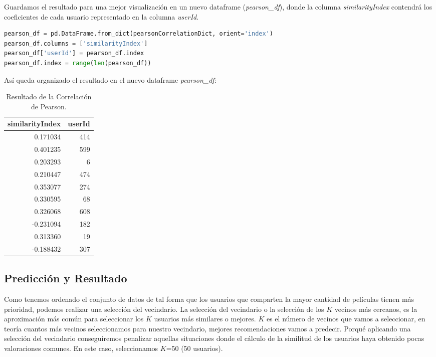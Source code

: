 \documentclass{uimppracticas}
\begin{document}
Guardamos el resultado para una mejor visualización en un nuevo dataframe (\textit{pearson\_df}), donde la columna \textit{similarityIndex} contendrá los coeficientes de cada usuario representado en la columna \textit{userId}.

\begin{lstlisting}[language=python, basicstyle=\small]
pearson_df = pd.DataFrame.from_dict(pearsonCorrelationDict, orient='index')
pearson_df.columns = ['similarityIndex']
pearson_df['userId'] = pearson_df.index
pearson_df.index = range(len(pearson_df))
\end{lstlisting}

\newpage

Así queda organizado el resultado en el nuevo dataframe \textit{pearson\_df}:

\begin{table}[H]
	\centering
	\begin{tabular}{rr}
		\toprule
		similarityIndex &  userId \\
		\midrule
		0.171034 &     414 \\
		0.401235 &     599 \\
		0.203293 &       6 \\
		0.210447 &     474 \\
		0.353077 &     274 \\
		0.330595 &      68 \\
		0.326068 &     608 \\
		-0.231094 &     182 \\
		0.313360 &      19 \\
		-0.188432 &     307 \\
		\bottomrule
	\end{tabular}
	\caption{Resultado de la Correlación de Pearson.}
\label{pearson_df}
\end{table}


\subsection{Predicción y Resultado}

Como tenemos ordenado el conjunto de datos de tal forma que los usuarios que comparten la mayor cantidad de películas tienen más prioridad, podemos realizar una selección del vecindario. La selección del vecindario o la selección de los $K$ vecinos más cercanos, es la aproximación más común para seleccionar los $K$ usuarios más similares o mejores. $K$ es el número de vecinos que vamos a seleccionar, en teoría cuantos más vecinos seleccionamos para nuestro vecindario, mejores recomendaciones vamos a predecir. Porqué aplicando una selección del vecindario conseguiremos penalizar aquellas situaciones donde el cálculo de la similitud de los usuarios haya obtenido pocas valoraciones comunes. En este caso, seleccionamos $K$=50 (50 usuarios).
\end{document}
